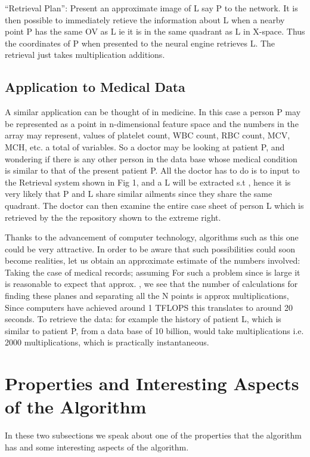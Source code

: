 \documentclass[english]{article}
\begin{document}
{}``Retrieval Plan'': Present an approximate image of L say P to
the network. It is then possible to immediately retieve the information
about L when a nearby point P has the same OV as L ie it is in the
same quadrant as L in X-space. Thus the coordinates 
of P when presented to the neural engine retrieves L. The retrieval
just takes  multiplication  additions. 


\subsection{Application to Medical Data}

A similar application can be thought of in medicine. In this case
a person P may be represented as a point in n-dimensional feature
space and the  numbers in the array  may
represent, values of platelet count, WBC count, RBC count, MCV, MCH,
etc. a total of  variables. So a doctor may be looking at patient
P, and wondering if there is any other person in the data base whose
medical condition is similar to that of the present patient P. All
the doctor has to do is to input  to the Retrieval
system shown in Fig 1, and a L will be extracted s.t ,
hence it is very likely that P and L share similar ailments since
they share the same quadrant. The doctor can then examine the entire
case sheet of person L which is retrieved by the the repository shown
to the extreme right.

Thanks to the advancement of computer technology, algorithms such
as this one could be very attractive. In order to be aware that such
possibilities could soon become realities, let us obtain an approximate
estimate of the numbers involved: Taking the case of medical records;
assuming  For such a problem since  is large
it is reasonable to expect that approx. , we see that the number
of calculations for finding these planes and separating all the N
points is approx  multiplications, Since computers
have achieved around 1 TFLOPS this translates to around 20 seconds.
To retrieve the data: for example the history of patient L, which
is similar to patient P, from a data base of 10 billion, would take
 multiplications i.e. 2000 multiplications, which is practically
instantaneous.


\section{Properties and Interesting Aspects of the Algorithm}

In these two subsections we speak about one of the properties that
the algorithm has and some interesting aspects of the algorithm.
\end{document}
